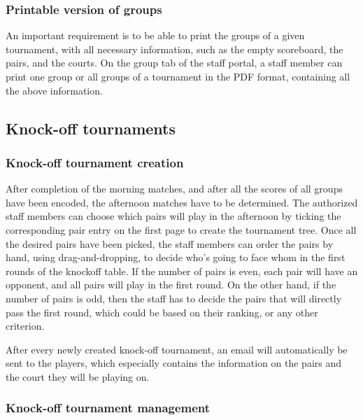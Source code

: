 \subsubsection{Printable version of groups}
\label{subs:Printable version of groups}


An important requirement is to be able to print the groups of a given
tournament, with all necessary information, such as the empty scoreboard, the
pairs, and the courts. On the group tab of the staff portal, a staff member can
print one group or all groups of a tournament in the PDF format, containing
all the above information.

\subsection{Knock-off tournaments}
\label{sub:Knock-off tournaments}

\subsubsection{Knock-off tournament creation}
\label{subs:Knock-off tournament creation}


After completion of the morning matches, and after all the scores of all groups
have been encoded, the afternoon matches have to be determined.
The authorized staff members can choose which pairs will play
in the afternoon by ticking the corresponding pair entry on the first page
to create the tournament tree. Once all the desired pairs have been picked,
the staff members can order the pairs by hand, using drag-and-dropping,
to decide who's going to face whom in the first rounds of the knockoff table.
If the number of pairs is even, each pair will have an opponent, and all pairs
will play in the first round. On the other hand, if the number of pairs is odd,
then the staff has to decide the pairs that will directly pass
the first round, which could be based on their ranking, or any other criterion.
\newline

After every newly created knock-off tournament, an email will automatically be
sent to the players, which especially contains the information on the pairs and
the court they will be playing on.

\subsubsection{Knock-off tournament management}
\label{subs:Knock-off tournament management}

